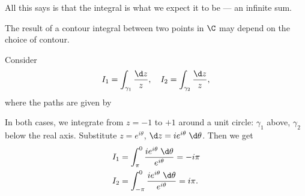 \documentclass[a4paper]{article}
\begin{document}
All this says is that the integral is what we expect it to be --- an infinite sum.

The result of a contour integral between two points in $\C$ may depend on the choice of contour.
\begin{eg}
  Consider
  \[
    I_1 = \int_{\gamma_1} \frac{\d z}{z},\quad I_2 = \int_{\gamma_2} \frac{\d z}{z},
  \]
  where the paths are given by
  \begin{center}
  \end{center}
  In both cases, we integrate from $z = -1$ to $+1$ around a unit circle: $\gamma_1$ above, $\gamma_2$ below the real axis. Substitute $z = e^{i\theta}$, $\d z = ie^{i\theta} \;\d \theta$. Then we get
  \begin{align*}
    I_1 &= \int_{\pi}^0 \frac{ie^{i\theta}\;\d \theta}{e^{i\theta}} = -i\pi\\
    I_2 &= \int_{-\pi}^0 \frac{ie^{i\theta}\;\d \theta}{e^{i\theta}} = i\pi.
  \end{align*}
\end{eg}
\end{document}
